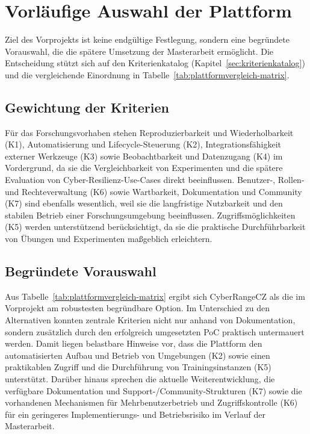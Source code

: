 \chapter{Vorläufige Auswahl der Plattform}
\label{chap:auswahl}

Ziel des Vorprojekts ist keine endgültige Festlegung, sondern eine begründete Vorauswahl, die die spätere Umsetzung der Masterarbeit ermöglicht. Die Entscheidung stützt sich auf den Kriterienkatalog (Kapitel~\ref{sec:kriterienkatalog}) und die vergleichende Einordnung in Tabelle~\ref{tab:plattformvergleich-matrix}. 

\section{Gewichtung der Kriterien}
Für das Forschungsvorhaben stehen Reproduzierbarkeit und Wiederholbarkeit (K1), Automatisierung und Lifecycle-Steuerung (K2), Integrationsfähigkeit externer Werkzeuge (K3) sowie Beobachtbarkeit und Datenzugang (K4) im Vordergrund, da sie die Vergleichbarkeit von Experimenten und die spätere Evaluation von Cyber-Resilienz-Use-Cases direkt beeinflussen. Benutzer-, Rollen- und Rechteverwaltung (K6) sowie Wartbarkeit, Dokumentation und Community (K7) sind ebenfalls wesentlich, weil sie die langfristige Nutzbarkeit und den stabilen Betrieb einer Forschungsumgebung beeinflussen. Zugriffsmöglichkeiten (K5) werden unterstützend berücksichtigt, da sie die praktische Durchführbarkeit von Übungen und Experimenten maßgeblich erleichtern.

\section{Begründete Vorauswahl}
Aus Tabelle~\ref{tab:plattformvergleich-matrix} ergibt sich CyberRangeCZ als die im Vorprojekt am robustesten begründbare Option. Im Unterschied zu den Alternativen konnten zentrale Kriterien nicht nur anhand von Dokumentation, sondern zusätzlich durch den erfolgreich umgesetzten PoC praktisch untermauert werden. Damit liegen belastbare Hinweise vor, dass die Plattform den automatisierten Aufbau und Betrieb von Umgebungen (K2) sowie einen praktikablen Zugriff und die Durchführung von Trainingsinstanzen (K5) unterstützt. Darüber hinaus sprechen die aktuelle Weiterentwicklung, die verfügbare Dokumentation und Support-/Community-Strukturen (K7) sowie die vorhandenen Mechanismen für Mehrbenutzerbetrieb und Zugriffskontrolle (K6) für ein geringeres Implementierungs- und Betriebsrisiko im Verlauf der Masterarbeit.

